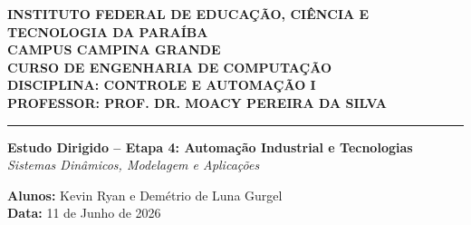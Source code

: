 \documentclass[12pt]{article}
\begin{document}
\begin{center}
    \begin{minipage}{0.2\textwidth}
    \end{minipage}
    \begin{minipage}{0.75\textwidth}
        \begin{center}
            \small\textbf{INSTITUTO FEDERAL DE EDUCAÇÃO, CIÊNCIA E TECNOLOGIA DA PARAÍBA} \\
            \small\textbf{CAMPUS CAMPINA GRANDE} \\
            \small\textbf{CURSO DE ENGENHARIA DE COMPUTAÇÃO} \\
            \small\textbf{DISCIPLINA: CONTROLE E AUTOMAÇÃO I} \\
            \small\textbf{PROFESSOR: PROF. DR. MOACY PEREIRA DA SILVA} \\
        \end{center}
    \end{minipage}
\end{center}

\vspace{0.2cm}
\hrule
\vspace{0.5cm}

\begin{center}
    \Large{\textbf{Estudo Dirigido -- Etapa 4: Automação Industrial e Tecnologias}} \\
    \large{\textit{Sistemas Dinâmicos, Modelagem e Aplicações}} \\
    \vspace{0.6cm}

    \large{\textbf{Alunos:} Kevin Ryan e Demétrio de Luna Gurgel} \\
    \large{\textbf{Data:} 11 de Junho de 2026} \\
\end{center}

\vspace{0.8cm}

\end{document}
